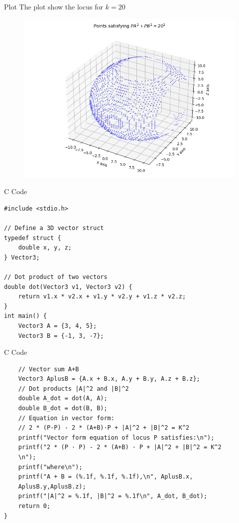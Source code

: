 \documentclass{beamer}
\begin{document}
\begin{frame}{Plot}
    The plot show the locus for $k=20$

\begin{figure}[H]
    \centering
    \includegraphics[width=0.8\columnwidth]{figs/plot2_1.png}
    \caption{}
    \label{fig:plot}
\end{figure}
\end{frame}

\begin{frame}[fragile]{C Code}
    \begin{verbatim}
#include <stdio.h>

// Define a 3D vector struct
typedef struct {
    double x, y, z;
} Vector3;

// Dot product of two vectors
double dot(Vector3 v1, Vector3 v2) {
    return v1.x * v2.x + v1.y * v2.y + v1.z * v2.z;
}
int main() {
    Vector3 A = {3, 4, 5};
    Vector3 B = {-1, 3, -7};
    \end{verbatim}
\end{frame}
\begin{frame}[fragile]{C Code}
    \begin{verbatim}
    // Vector sum A+B
    Vector3 AplusB = {A.x + B.x, A.y + B.y, A.z + B.z};
    // Dot products |A|^2 and |B|^2
    double A_dot = dot(A, A);
    double B_dot = dot(B, B);
    // Equation in vector form:
    // 2 * (P·P) - 2 * (A+B)·P + |A|^2 + |B|^2 = K^2
    printf("Vector form equation of locus P satisfies:\n");
    printf("2 * (P · P) - 2 * (A+B) · P + |A|^2 + |B|^2 = K^2
    \n");
    printf("where\n");
    printf("A + B = (%.1f, %.1f, %.1f),\n", AplusB.x, 
    AplusB.y,AplusB.z);
    printf("|A|^2 = %.1f, |B|^2 = %.1f\n", A_dot, B_dot);
    return 0;
}
    \end{verbatim}
\end{frame}
\end{document}
